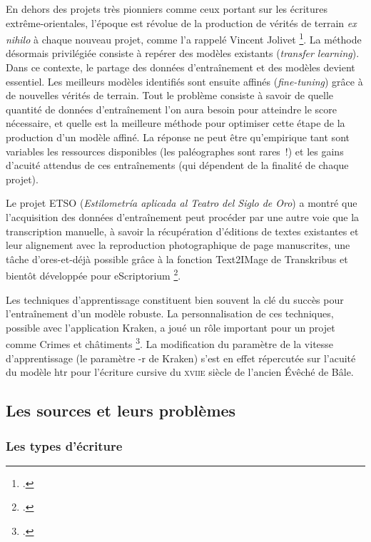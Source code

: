 \documentclass[a4paper,12pt,twoside]{book}
\newcommand{\siecle}[1]{\textsc{#1}\ieme}
\begin{document}
				En dehors des projets très pionniers comme ceux portant sur les
				écritures extrême-orientales, l'époque est révolue de la production de
				vérités de terrain \textit{ex nihilo} à chaque nouveau projet, comme l'a
				rappelé Vincent Jolivet
				\footcite{torresaguilarModelisationAffinageHTR2022}.
				La méthode désormais privilégiée consiste à repérer des modèles
				existants (\textit{transfer learning}). Dans ce contexte, le partage des
				données d'entraînement et des modèles devient essentiel. Les meilleurs
				modèles identifiés sont ensuite affinés (\textit{fine-tuning}) grâce à de nouvelles vérités de terrain. Tout le problème consiste à savoir de
				quelle quantité de données d'entraînement l'on aura besoin pour
				atteindre le score nécessaire, et quelle est la meilleure méthode pour
				optimiser cette étape de la production d'un modèle affiné. La réponse ne
				peut être qu'empirique tant sont variables les ressources disponibles 
				(les paléographes sont rares~!) et les gains d'acuité attendus de ces
				entraînements (qui dépendent de la finalité de chaque projet).
				
				Le projet ETSO (\textit{Estilometría aplicada al Teatro del Siglo de Oro})
				a montré que l'acquisition des données d'entraînement peut
				procéder par une autre voie que la transcription manuelle, à savoir la
				récupération d'éditions de textes existantes et leur alignement avec la
				reproduction photographique de page manuscrites, une tâche
				d'ores-et-déjà possible grâce à la fonction Text2IMage de Transkribus et
				bientôt développée pour eScriptorium
				\footcite{cuellarModeleOuvertPour2022}.
				
				Les techniques d'apprentissage constituent bien souvent la clé du succès
				pour l'entraînement d'un modèle robuste. La personnalisation de ces
				techniques, possible avec l'application Kraken, a joué un rôle important
				pour un projet comme \og Crimes et châtiments \fg{} \footcite{paupeCursive17eSiecle2022}. La modification du paramètre de la
				vitesse d'apprentissage (le paramètre \textsf{-r}  de Kraken) s'est en effet répercutée sur l'acuité du modèle \gls{htr} pour l'écriture cursive du \siecle{xviie} siècle de l'ancien Évêché de Bâle.
			
			\subsection{Les sources et leurs problèmes}
			
				\subsubsection{Les types d'écriture}
				
\end{document}
